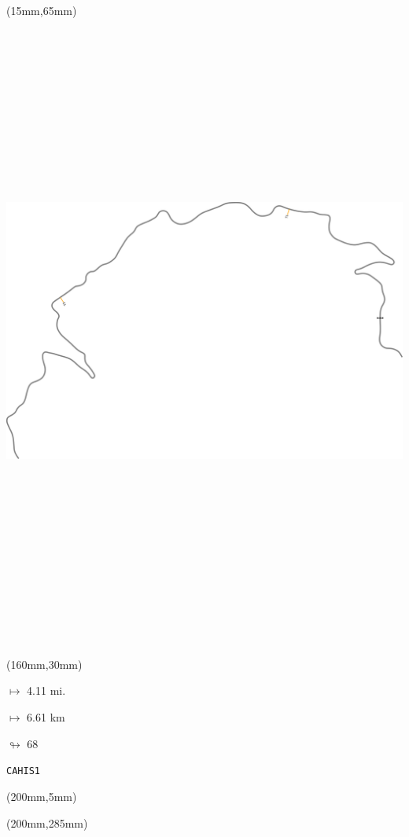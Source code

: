 \begin{textblock*}{185mm}(15mm,65mm)%
\centering
\mbox{\includegraphics[width=185mm,height=210mm,keepaspectratio]{PT/CAHIS1.pdf}}
\end{textblock*}
\begin{textblock*}{40mm}(160mm,30mm)%
\Large
\par$\mapsto$ 4.11 mi.
\par$\mapsto$ 6.61 km
\par$\looparrowright$ 68
\par\hfill\tiny\tt CAHIS1\\
\end{textblock*}
\begin{textblock*}{20mm}(200mm,5mm)%
\fbox{\thepage}
\label{CAHIS1}
\end{textblock*}
\begin{textblock*}{20mm}(200mm,285mm)%
\fbox{\thepage}
\end{textblock*}

